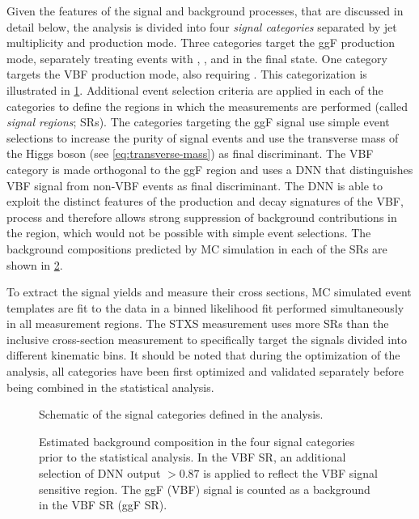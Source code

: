 Given the features of the signal and background processes, that are discussed in detail below, the analysis is divided into four \emph{signal categories} separated by jet multiplicity and production mode.
Three categories target the ggF production mode, separately treating events with \ZeroJet, \OneJet, and \TwoJet in the final state. One category targets the VBF production mode, also requiring \TwoJet. 
This categorization is illustrated in \cref{fig:signal-categorization}.
Additional event selection criteria are applied in each of the categories to define the regions in which the measurements are performed (called \emph{signal regions}; SRs).
The categories targeting the ggF signal use simple event selections to increase the purity of signal events and use the transverse mass of the Higgs boson (see \cref{eq:transverse-mass}) as final discriminant.
The VBF \TwoJet category is made orthogonal to the ggF \TwoJet region and uses a DNN that distinguishes VBF signal from non-VBF events as final discriminant.
The DNN is able to exploit the distinct features of the production and decay signatures of the VBF, \HWW process and therefore allows strong suppression of background contributions in the \TwoJet region, which would not be possible with simple event selections. 
The background compositions predicted by MC simulation in each of the SRs are shown in \cref{fig:bkg-composition}.

To extract the signal yields and measure their cross sections, MC simulated event templates are fit to the data in a binned likelihood fit performed simultaneously in all measurement regions.
The STXS measurement uses more SRs than the inclusive cross-section measurement to specifically target the signals divided into different kinematic bins. 
It should be noted that during the optimization of the analysis, all categories have been first optimized and validated separately before being combined in the statistical analysis.

\begin{figure}[ht]
    \caption{Schematic of the signal categories defined in the \HWW analysis.}
    \label{fig:signal-categorization}
\end{figure}
\begin{figure}[h!]
     \hfill
    \caption[Estimated background composition in the four signal categories.]{Estimated background composition in the four signal categories prior to the statistical analysis. In the VBF \TwoJet SR, an additional selection of DNN output $>0.87$ is applied to reflect the VBF signal sensitive region. The ggF (VBF) signal is counted as a background in the VBF SR (ggF SR).}
    \label{fig:bkg-composition}
\end{figure}

